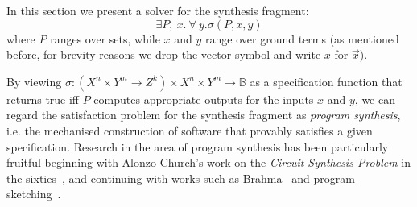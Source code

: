 \algrenewcommand{}
\algrenewcommand{}


\newcommand*\Let[2]{\State #1 $\gets$ #2}

\newcommand{\bv}[2]{\mathcal{BV}(#1, #2)}

\makeatletter
{}
\makeatother


In this section we present a solver for the synthesis fragment:
 \[
  \exists P,~ x . ~\forall~ y . \sigma(P, x, y)
 \]
%
where $P$ ranges over sets, while $x$ and $y$ range over ground terms (as mentioned before, for brevity reasons we drop
 the vector symbol and write  $x$ for $\vec{x}$).

By viewing $\sigma: (X^n \times Y^m \to Z^k) \times X^n \times Y^m  \to \mathbb{B}$ as a specification function
that  returns true iff $P$ computes appropriate outputs for the inputs $x$ and $y$, we can   
regard the satisfaction problem for the synthesis fragment as \emph{program synthesis}, i.e.
the mechanised construction of software that provably satisfies a given specification.
Research in the area of program synthesis has been particularly fruitful beginning with Alonzo Church's work on the
\emph{Circuit Synthesis Problem} in the sixties~\cite{church-synth}, and continuing with works such as 
{\sc Brahma}~\cite{brahma} and program sketching~\cite{lezama-thesis,sketch,modular-sketch}.

% 
  

